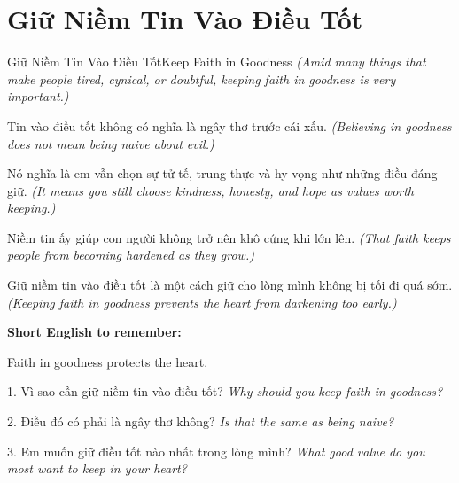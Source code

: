 \section{Giữ Niềm Tin Vào Điều Tốt}
\begin{truyen}{Giữ Niềm Tin Vào Điều Tốt}{Keep Faith in Goodness}
\textit{(Amid many things that make people tired, cynical, or doubtful, keeping faith in goodness is very important.)}

Tin vào điều tốt không có nghĩa là ngây thơ trước cái xấu.
\textit{(Believing in goodness does not mean being naive about evil.)}

Nó nghĩa là em vẫn chọn sự tử tế, trung thực và hy vọng như những điều đáng giữ.
\textit{(It means you still choose kindness, honesty, and hope as values worth keeping.)}

Niềm tin ấy giúp con người không trở nên khô cứng khi lớn lên.
\textit{(That faith keeps people from becoming hardened as they grow.)}
\end{truyen}

\begin{baihoc}
Giữ niềm tin vào điều tốt là một cách giữ cho lòng mình không bị tối đi quá sớm.
\textit{(Keeping faith in goodness prevents the heart from darkening too early.)}
\end{baihoc}

\begin{ghinhoanh}
\textbf{Short English to remember:}

Faith in goodness protects the heart.

\end{ghinhoanh}

\begin{tuhocnhanh}
1. Vì sao cần giữ niềm tin vào điều tốt? \textit{Why should you keep faith in goodness?}

2. Điều đó có phải là ngây thơ không? \textit{Is that the same as being naive?}

3. Em muốn giữ điều tốt nào nhất trong lòng mình? \textit{What good value do you most want to keep in your heart?}
\end{tuhocnhanh}
\ngancach